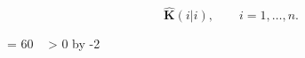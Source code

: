 \documentclass{article}
\begin{document}

\begin{equation}
\widehat{\mathbf{K}}(i|i),\qquad i=1,\dots,n.
\end{equation}

 = 60
\loop
\number{}\
\ifnum{} > 0
\advance\count255 by -2
\repeat

    
\end{document}
